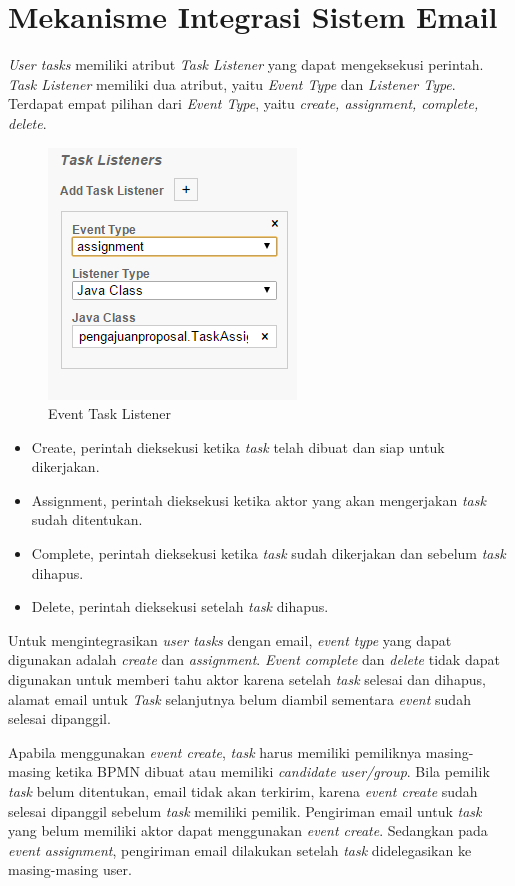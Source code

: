 \section{Mekanisme Integrasi Sistem Email}
\label{integrasi}
\textit{User tasks} memiliki atribut \textit{Task Listener} yang dapat mengeksekusi perintah. \textit{Task Listener} memiliki dua atribut, yaitu \textit{Event Type} dan \textit{Listener Type}. Terdapat empat pilihan dari \textit{Event Type}, yaitu \textit{create, assignment, complete, delete}. 
		\begin{figure}[H]
			\centering
			\includegraphics[scale=1]{Gambar/Bab-3/TaskListener}
			\caption{Event Task Listener} 
			\label{fig:eventtasklistener}
		\end{figure}
\begin{itemize}
	\item Create, perintah dieksekusi ketika \textit{task} telah dibuat dan siap untuk dikerjakan. 
	\item Assignment, perintah dieksekusi ketika aktor yang akan mengerjakan \textit{task} sudah ditentukan.
	\item Complete, perintah dieksekusi ketika \textit{task} sudah dikerjakan dan sebelum \textit{task} dihapus.
	\item Delete, perintah dieksekusi setelah \textit{task} dihapus.
\end{itemize}


Untuk mengintegrasikan \textit{user tasks} dengan email, \textit{event type} yang dapat digunakan adalah \textit{create} dan \textit{assignment}. \textit{Event complete} dan \textit{delete} tidak dapat digunakan untuk memberi tahu aktor karena setelah \textit{task} selesai dan dihapus, alamat email untuk \textit{Task} selanjutnya belum diambil sementara \textit{event} sudah selesai dipanggil.

Apabila menggunakan \textit{event create}, \textit{task} harus memiliki pemiliknya masing-masing ketika BPMN dibuat atau memiliki \textit{candidate user/group}. Bila pemilik \textit{task} belum ditentukan, email tidak akan terkirim, karena \textit{event create} sudah selesai dipanggil sebelum \textit{task} memiliki pemilik. Pengiriman email untuk \textit{task} yang belum memiliki aktor dapat menggunakan \textit{event create}. Sedangkan pada \textit{event assignment}, pengiriman email dilakukan setelah \textit{task} didelegasikan ke masing-masing user.





